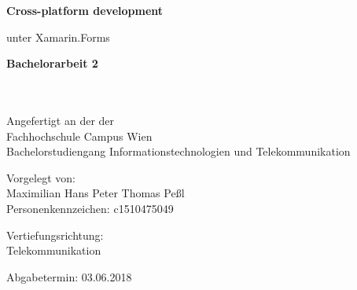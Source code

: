 \begin{center}

\vspace{1.3cm}

\hspace*{-1.0cm} {\Large \textbf{Cross-platform development\\}}

\hspace*{-1.0cm} unter Xamarin.Forms \\

\vspace{2.2cm}

\hspace*{-1.0cm} \textbf{Bachelorarbeit 2\\}

\vspace{0.65cm}

\hspace*{-1.0cm}\\
\hspace*{-1.0cm}\\
\hspace*{-1.0cm} Angefertigt an der der \\
\hspace*{-1.0cm} Fachhochschule Campus Wien \\
\hspace*{-1.0cm} Bachelorstudiengang Informationstechnologien und Telekommunikation \\

\vspace{7cm}

\hspace*{-1.0cm} Vorgelegt von: \\
\hspace*{-1.0cm} Maximilian Hans Peter Thomas Peßl \\
\hspace*{-1.0cm} Personenkennzeichen: c1510475049 \\

\vspace{2.1cm}

\hspace*{-1.0cm} Vertiefungsrichtung: \\
\hspace*{-1.0cm} Telekommunikation\\

\vspace{0.5cm}


\vspace{1.4cm}

\hspace*{-1.0cm} Abgabetermin: 03.06.2018 \\

\end{center}

